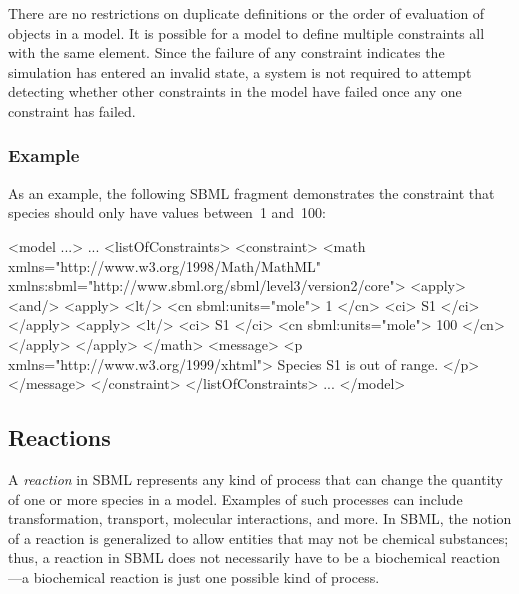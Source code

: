 There are no restrictions on duplicate \Constraint
definitions or the order of evaluation of \Constraint objects in a
model.  It is possible for a model to define multiple constraints
all with the same  element.  Since the failure of any
constraint indicates the simulation has entered an invalid state,
a system is not required to attempt detecting whether
other constraints in the model have failed once any one constraint
has failed.


\subsubsection{Example}

As an example, the following SBML fragment demonstrates the
constraint that species  should only have values between~1
and~100:

\begin{example}
<model ...>
    ...
    <listOfConstraints>
        <constraint>
            <math xmlns="http://www.w3.org/1998/Math/MathML"
                  xmlns:sbml="http://www.sbml.org/sbml/level3/version2/core">
                <apply>
                    <and/>
                        <apply> 
                          <lt/> 
                          <cn sbml:units="mole"> 1 </cn> 
                          <ci> S1 </ci> 
                        </apply>
                        <apply> 
                          <lt/> 
                          <ci> S1 </ci>  
                          <cn sbml:units="mole"> 100 </cn> 
                        </apply>
                </apply>
            </math>
            <message>
                <p xmlns="http://www.w3.org/1999/xhtml"> Species S1 is out of range. </p>
            </message>
        </constraint>
    </listOfConstraints>
    ...
</model>
\end{example}


\subsection{Reactions}
\label{sec:reactions}

A \emph{reaction} in SBML represents any kind of process that can
change the quantity of one or more species in a model.  Examples
of such processes can include transformation, transport, molecular
interactions, and more.  In SBML, the notion of a reaction is
generalized to allow entities that may not be chemical substances;
thus, a reaction in SBML does not necessarily have to be a
biochemical reaction---a biochemical reaction is just one possible
kind of process.

